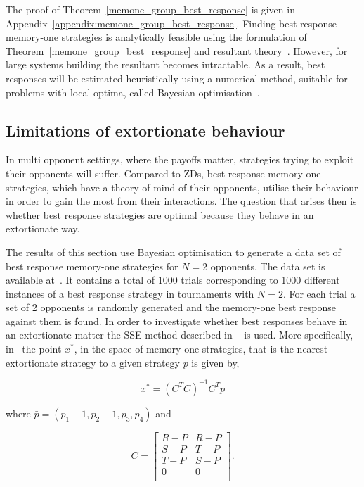 \documentclass[10pt]{article}
\begin{document}
The proof of Theorem~\ref{memone_group_best_response} is given in
Appendix~\ref{appendix:memone_group_best_response}.
Finding best response memory-one strategies is analytically feasible using the
formulation of Theorem~\ref{memone_group_best_response} and resultant
theory~\cite{Jonsson2005}. However, for large systems building the resultant
becomes intractable. As a result, best responses will be estimated
heuristically using a numerical method, suitable for problems with local optima,
called Bayesian optimisation~\cite{Mokus1978}.

\subsection{Limitations of extortionate behaviour}

In multi opponent settings,
where the payoffs matter, strategies trying to exploit their opponents will
suffer.
Compared to ZDs, best response memory-one strategies, which have a
theory of mind of their opponents, utilise their behaviour in order to gain the
most from their interactions. The question that arises then is whether best
response strategies are optimal because they behave in an extortionate way.

The results of this section use Bayesian optimisation to generate a data set of best response
memory-one strategies for \(N=2\) opponents.
The data set is available at~\cite{glynatsi2019}. It contains a total of 1000 trials
corresponding to 1000 different instances of a best response strategy in
tournaments with \(N=2\). For each trial a set of 2 opponents is
randomly generated and the memory-one best response against them is found.
In order to investigate whether best responses
behave in an extortionate matter the SSE method described in ~\cite{Knight2019} is used. More
specifically,
in~\cite{Knight2019} the point \(x^*\), in the space of memory-one strategies,
that is
the nearest extortionate strategy to a given strategy \(p\) is
given by,

\begin{equation}\label{eqn:x_star_formula}
    x^* = {\left(C^{T}C\right)}^{-1}C^{T}\bar{p}
\end{equation}

where \(\bar{p}=(p_1 - 1, p_2 - 1, p_3, p_4)\) and

\begin{equation}\label{eq:definition_of_C}
    C =
    \begin{bmatrix}
        R - P & R- P \\
        S - P & T- P \\
        T - P & S- P \\
        0     & 0 \\
    \end{bmatrix}.
\end{equation}
\end{document}
